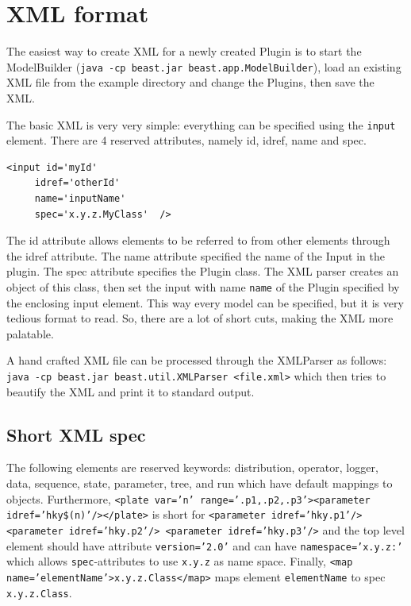 \documentclass{article}
\begin{document}
\section{XML format\label{sec.xml}}

The easiest way to create XML for a newly created Plugin is to start the ModelBuilder
({\tt java -cp beast.jar beast.app.ModelBuilder}), load an existing XML file
from the example directory and change the Plugins, then save the XML.

The basic XML is very very simple: everything can be specified using
the {\tt input} element. There are 4 reserved attributes, namely id, idref, 
name and spec.

\begin{verbatim}<input id='myId'
     idref='otherId'
     name='inputName'
     spec='x.y.z.MyClass'  />
\end{verbatim}

The id attribute allows elements to be referred to from other elements through
the idref attribute. The name attribute specified the name of the Input in the
plugin. The spec attribute specifies the Plugin class. The XML parser creates
an object of this class, then set the input with name {\tt name} of the Plugin
specified by the enclosing input element. This way every model can be 
specified, but it is very tedious format to read. So, there are a lot of 
short cuts, making the XML more palatable.

A hand crafted XML file can be processed through the XMLParser as follows:
{\tt java -cp beast.jar beast.util.XMLParser <file.xml>} which then 
tries to beautify the XML and print it to standard output.

\subsection{Short XML spec}
The following elements are reserved keywords:
distribution, operator, logger, data, sequence, state, parameter, tree, and run
which have default mappings to objects.
Furthermore, {\tt <plate var='n' range='.p1,.p2,.p3'><parameter idref='hky\$(n)'/></plate>}
is short for 
{\tt <parameter idref='hky.p1'/>
<parameter idref='hky.p2'/>
<parameter idref='hky.p3'/>}
and the top level element should have attribute {\tt version='2.0'}
and can have {\tt namespace='x.y.z:'} which allows {\tt spec}-attributes
to use {\tt x.y.z} as name space. Finally, {\tt <map name='elementName'>x.y.z.Class</map>}
maps element {\tt elementName} to spec {\tt x.y.z.Class}.
\end{document}

